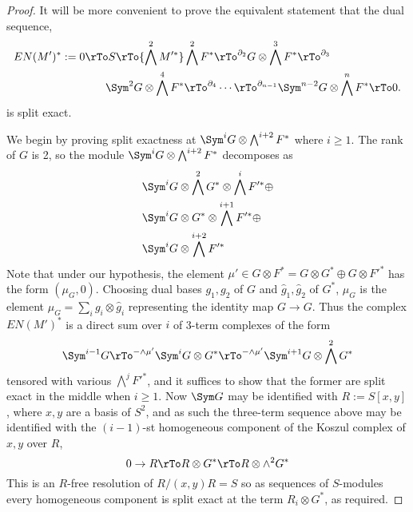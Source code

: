 \begin{proof}
It will be more convenient to prove the equivalent statement that 
the dual sequence,  
\begin{align*}
EN(M')^* := 
0\rTo S \rTo{\bigwedge^2 M'^*} 
 &\bigwedge^2 F^*
 \rTo^{\partial_{2}}
 G\otimes \bigwedge^3 F^*  
 \rTo^{\partial_{3}}\\
  \Sym^2G\otimes\bigwedge^4F^*  
 &\rTo^{\partial_{4}}\cdots\rTo^{\partial_{n-1}} 
\Sym^{n-2}G\otimes\bigwedge^nF^* 
 \rTo 0.
\end{align*}
is split exact.

We begin by proving split exactness at  
 $\Sym^{i} G \otimes \bigwedge^{i+2}  F^*$ where $i\geq 1$.
The rank of $G$ is 2, so the module
$ \Sym^{i} G \otimes \bigwedge^{i+2}  F^*$
decomposes as
\begin{align*}
&\Sym^{i} G \otimes \bigwedge^2 G^* \otimes \bigwedge^{i} F'^*\oplus \\
&\Sym^{i} G \otimes  G^*\otimes \bigwedge^{i+1} F'^* \oplus \\
&\Sym^{i} G \otimes  \bigwedge^{i+2} F'^* 
\end{align*}
Note that under our hypothesis, the element $\mu' \in G\otimes F^* = G\otimes G^* \oplus G\otimes F'^*$
has the form $(\mu_G, 0)$. Choosing dual bases $g_1,g_2$ of $G$ and $\widehat g_1,\widehat g_2$ of $G^*$,
$\mu_G$ is the element
 $\mu_G = \sum_i g_i\otimes \widehat g_i$
representing the identity map $G \to G$. Thus the complex
$EN(M')^*$ is a direct sum over $i$ of 3-term complexes of the form
$$
\Sym^{i-1} G 
\rTo^{-\wedge \mu'} 
\Sym^{i} G \otimes  G^*
\rTo^{-\wedge \mu'} 
\Sym^{i+1} G \otimes \bigwedge^2 G^* 
$$
tensored with various $\bigwedge^j F'^*$, and it suffices to show that the former are split exact in the middle
when
$i\geq 1$. Now $\Sym G$ may be identified with $R:= S[x,y]$, where $x,y$ are a basis of $S^2$, and
as such the three-term sequence above may be identified with the $(i-1)$-st homogeneous component 
of the Koszul complex of $x,y$ over $R$,
$$
0\to R \rTo R\otimes G^* \rTo R\otimes \wedge^2 G^*
$$
This is an $R$-free resolution of  $R/(x,y)R = S$ so as sequences
of $S$-modules every homogeneous component is split exact at the term $R_i\otimes G^*$,
as required.


\end{proof}

